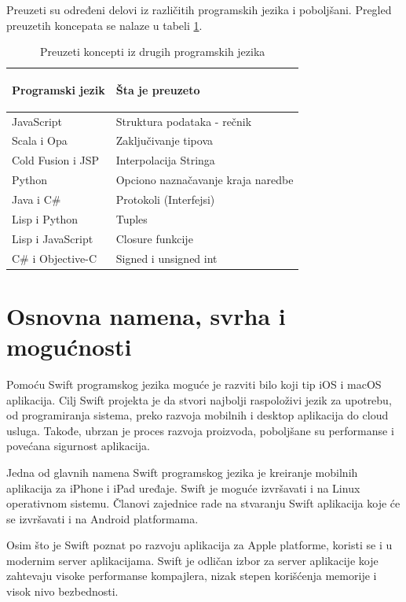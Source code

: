 \documentclass[a4paper]{article}
\begin{document}
Preuzeti su određeni delovi iz različitih programskih jezika i poboljšani. Pregled preuzetih koncepata se nalaze u tabeli \ref{tab:tabela2}.

\begin{table}[h!]
\begin{center}
\caption{Preuzeti koncepti iz drugih programskih jezika}
\begin{tabular}{|l|l|} \hline
\label{tab:tabela2}

Programski jezik & Šta je preuzeto \\ \hline
JavaScript & Struktura podataka - rečnik  \\ \hline
Scala i Opa & Zaključivanje tipova \\ \hline
Cold Fusion i JSP & Interpolacija Stringa \\ \hline
Python & Opciono naznačavanje kraja naredbe \\ \hline
Java i C\# & Protokoli (Interfejsi) \\ \hline
Lisp i Python & Tuples \\ \hline
Lisp i JavaScript &  Closure funkcije \\ \hline
C\# i Objective-C & Signed i unsigned int \\ \hline
\end{tabular}
\end{center}
\end{table}

\section{Osnovna namena, svrha i mogućnosti}	
\label{sec:treciDeo}
Pomoću Swift programskog jezika moguće je razviti bilo koji tip iOS i macOS aplikacija. Cilj Swift projekta je da stvori najbolji raspoloživi jezik za upotrebu, od programiranja sistema, preko razvoja mobilnih i desktop aplikacija do cloud usluga. Takođe, ubrzan je proces razvoja proizvoda, poboljšane su performanse i povećana sigurnost aplikacija.

Jedna od glavnih namena Swift programskog jezika je kreiranje mobilnih aplikacija za iPhone i iPad uređaje. Swift je moguće izvršavati i na Linux operativnom sistemu. Članovi zajednice rade na stvaranju Swift aplikacija koje će se izvršavati i na Android platformama.

Osim što je Swift poznat po razvoju aplikacija za Apple platforme, koristi se i u modernim server aplikacijama. Swift je odličan izbor za server aplikacije koje zahtevaju visoke performanse kompajlera, nizak stepen korišćenja memorije i visok nivo bezbednosti.
\end{document}
